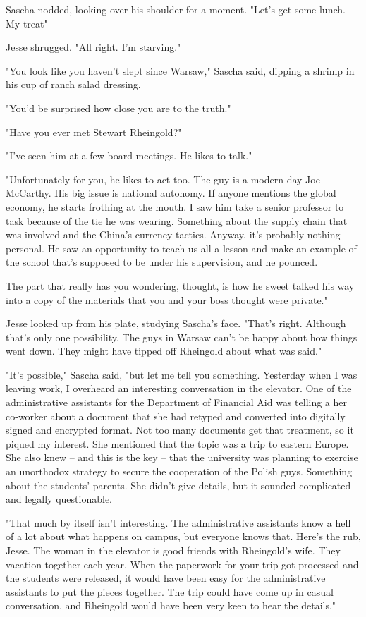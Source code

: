 Sascha nodded, looking over his shoulder for a moment.  "Let's get some lunch.  My treat"

Jesse shrugged.  "All right.  I'm starving."


"You look like you haven't slept since Warsaw," Sascha said, dipping a shrimp in his cup of ranch salad dressing.

"You'd be surprised how close you are to the truth."

"Have you ever met Stewart Rheingold?"

"I've seen him at a few board meetings.  He likes to talk."

"Unfortunately for you, he likes to act too.  The guy is a modern day Joe McCarthy.  His big issue is national autonomy.  If anyone mentions the global economy, he starts frothing at the mouth.  I saw him take a senior professor to task because of the tie he was wearing.  Something about the supply chain that was involved and the China's currency tactics.  Anyway, it's probably nothing personal.  He saw an opportunity to teach us all a lesson and make an example of the school that's supposed to be under his supervision, and he pounced.

The part that really has you wondering, thought, is how he sweet talked his way into a copy of the materials that you and your boss thought were private."

Jesse looked up from his plate, studying Sascha's face.  "That's right.  Although that's only one possibility.  The guys in Warsaw can't be happy about how things went down.  They might have tipped off Rheingold about what was said."

"It's possible," Sascha said, "but let me tell you something.  Yesterday when I was leaving work, I overheard an interesting conversation in the elevator.  One of the administrative assistants for the Department of Financial Aid was telling a her co-worker about a document that she had retyped and converted into digitally signed and encrypted format.  Not too many documents get that treatment, so it piqued my interest.  She mentioned that the topic was a trip to eastern Europe.  She also knew -- and this is the key -- that the university was planning to exercise an unorthodox strategy to secure the cooperation of the Polish guys.  Something about the students' parents.  She didn't give details, but it sounded complicated and legally questionable.

"That much by itself isn't interesting.  The administrative assistants know a hell of a lot about what happens on campus, but everyone knows that.  Here's the rub, Jesse.  The woman in the elevator is good friends with Rheingold's wife.  They vacation together each year.  When the paperwork for your trip got processed and the students were released, it would have been easy for the administrative assistants to put the pieces together.  The trip could have come up in casual conversation, and Rheingold would have been very keen to hear the details."

